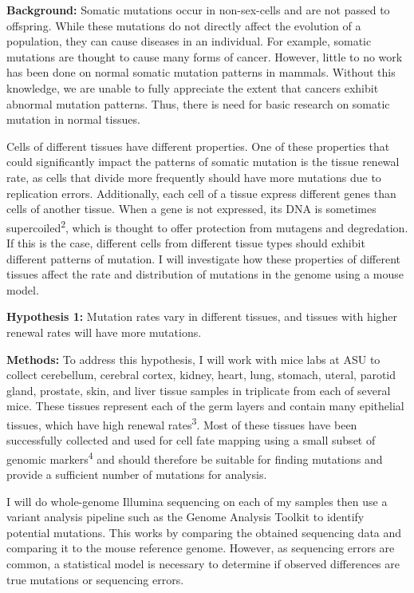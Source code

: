 \documentclass[12pt]{article}
\begin{document}
\noindent
\textbf{Background:}
Somatic mutations occur in non-sex-cells and are not passed to offspring.
While these mutations do not directly affect the evolution of a population, they can cause diseases in an individual.
For example, somatic mutations are thought to cause many forms of cancer.
However, little to no work has been done on normal somatic mutation patterns in mammals.
Without this knowledge, we are unable to fully appreciate the extent that cancers exhibit abnormal mutation patterns.
Thus, there is need for basic research on somatic mutation in normal tissues.

Cells of different tissues have different properties.
One of these properties that could significantly impact the patterns of somatic mutation is the tissue renewal rate, as cells that divide more frequently should have more mutations due to replication errors.
Additionally, each cell of a tissue express different genes than cells of another tissue.
When a gene is not expressed, its DNA is sometimes supercoiled\textsuperscript{2}, which is thought to offer protection from mutagens and degredation.
If this is the case, different cells from different tissue types should exhibit different patterns of mutation.
I will investigate how these properties of different tissues affect the rate and distribution of mutations in the genome using a mouse model.

\textbf{Hypothesis 1:}
Mutation rates vary in different tissues, and tissues with higher renewal rates will have more mutations.

\textbf{Methods:}
To address this hypothesis, I will work with mice labs at ASU to collect cerebellum, cerebral cortex, kidney, heart, lung, stomach, uteral, parotid gland, prostate, skin, and liver tissue samples in triplicate from each of several mice.
These tissues represent each of the germ layers and contain many epithelial tissues, which have high renewal rates\textsuperscript{3}.
Most of these tissues have been successfully collected and used for cell fate mapping using a small subset of genomic markers\textsuperscript{4} and should therefore be suitable for finding mutations and provide a sufficient number of mutations for analysis.

I will do whole-genome Illumina sequencing on each of my samples then use a variant analysis pipeline such as the Genome Analysis Toolkit to identify potential mutations.
This works by comparing the obtained sequencing data and comparing it to the mouse reference genome.
However, as sequencing errors are common, a statistical model is necessary to determine if observed differences are true mutations or sequencing errors.
\end{document}
